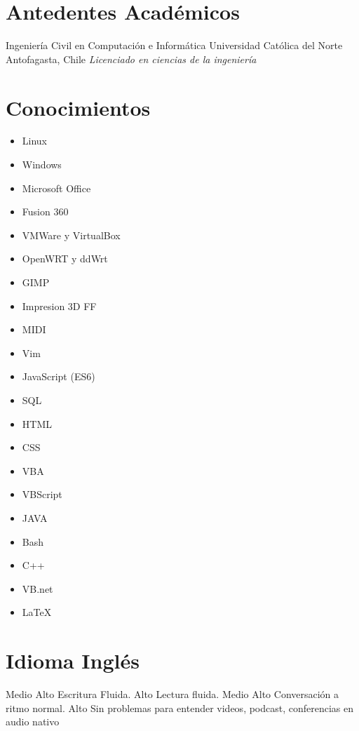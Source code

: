 \documentclass[draft,color,12pt,letterpaper,sans]{moderncv}
\begin{document}
\newpage

\section{Antedentes Acad\'emicos}
{Ingenier\'ia Civil en Computaci\'on e Inform\'atica}
{Universidad Cat\'olica del Norte}
{Antofagasta, Chile}
{\textit{Licenciado en ciencias de la ingenier\'ia}}
{}

\section{Conocimientos}
\begin{cvcolumns}
{
	\begin{itemize}
		\item
			Linux
		\item
			Windows
		\item
			Microsoft Office
		\item
			Fusion 360
		\item
			VMWare y VirtualBox
		\item
			OpenWRT y ddWrt
		\item
			GIMP
		\item
			Impresion 3D FF
		\item
			MIDI
		\item	
			Vim
	\end{itemize}
}


{
	\begin{itemize}
		\item
			JavaScript (ES6)
		\item
			SQL
		\item
			HTML
		\item
			CSS
		\item
			VBA
		\item	
			VBScript
		\item
			JAVA		
		\item
			Bash
		\item
			C++
		\item
			VB.net
		\item
			LaTeX
	\end{itemize}
}
\end{cvcolumns}

\section{Idioma Ingl\'es}
{Medio Alto}
{Escritura Fluida.}
{Alto}
{Lectura fluida.}
{Medio Alto}
{Conversaci\'on a ritmo normal.}
{Alto}
{Sin problemas para entender videos, podcast, conferencias en audio nativo}









\end{document}
